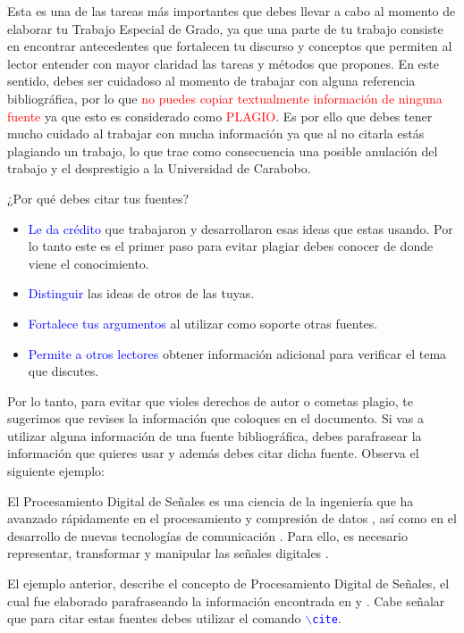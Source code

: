 Esta es una de las tareas más importantes que debes llevar a cabo al momento de elaborar tu Trabajo Especial de Grado, ya que una parte de tu trabajo consiste en encontrar antecedentes que fortalecen tu discurso y conceptos que permiten al lector entender con mayor claridad las tareas y métodos que propones. En este sentido, debes ser cuidadoso al momento de trabajar con alguna referencia bibliográfica, por lo que \textcolor{red}{no puedes copiar textualmente información de ninguna fuente} ya que esto es considerado como \textcolor{red}{PLAGIO}. Es por ello que debes tener mucho cuidado al trabajar con mucha información ya que al no citarla estás plagiando un trabajo, lo que trae como consecuencia una posible anulación del trabajo y el desprestigio a la Universidad de Carabobo. 

¿Por qué debes citar tus fuentes?

\begin{itemize}
\item \textcolor{blue}{Le da crédito} que trabajaron y desarrollaron esas ideas que estas usando. Por lo tanto este es el primer paso para evitar plagiar debes conocer de donde viene el conocimiento.
\item \textcolor{blue}{Distinguir} las ideas de otros de las tuyas.
\item \textcolor{blue}{Fortalece tus argumentos} al utilizar como soporte otras fuentes.
\item \textcolor{blue}{Permite a otros lectores} obtener información adicional para verificar el tema que discutes.
\end{itemize}

Por lo tanto, para evitar que violes derechos de autor o cometas plagio, te sugerimos que revises la información que coloques en el documento. Si vas a utilizar alguna información de una fuente bibliográfica, debes parafrasear la información que quieres usar y además debes citar dicha fuente. Observa el siguiente ejemplo:

El Procesamiento Digital de Señales es una ciencia de la ingeniería que ha avanzado rápidamente en el procesamiento y compresión de datos , así como en el desarrollo de nuevas tecnologías de comunicación \cite{MoyaPDS}. Para ello, es necesario representar, transformar y manipular las señales digitales \cite{GanoaPDS}.  

El ejemplo anterior, describe el concepto de Procesamiento Digital de Señales, el cual fue elaborado parafraseando la información encontrada en \cite{MoyaPDS} y \cite{GanoaPDS}. Cabe señalar que para citar estas fuentes debes utilizar el comando \textcolor{blue}{$\backslash$\texttt{cite}}. 


